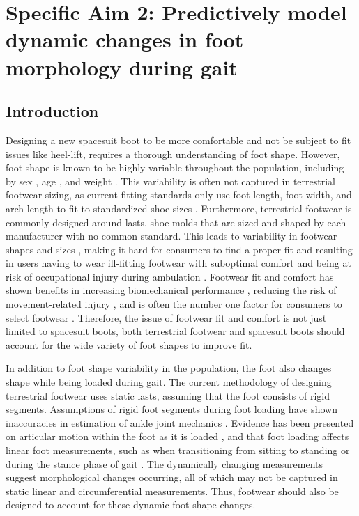 \documentclass[defaultstyle,11pt]{thesis}
\begin{document}
\hypertarget{sec:SA2}{%
\chapter{Specific Aim 2: Predictively model dynamic changes in foot morphology during gait}\label{sec:SA2}}

\hypertarget{introduction-1}{%
\section{Introduction}\label{introduction-1}}

Designing a new spacesuit boot to be more comfortable and not be subject to fit issues like heel-lift, requires a thorough understanding of foot shape.
However, foot shape is known to be highly variable throughout the population, including by sex \citep{Wunderlich2001, Krauss2008, Krauss2010}, age \citep{Tomassoni2014}, and weight \citep{Price2016}.
This variability is often not captured in terrestrial footwear sizing, as current fitting standards only use foot length, foot width, and arch length to fit to standardized shoe sizes \citep{ASTM2017}.
Furthermore, terrestrial footwear is commonly designed around lasts, shoe molds that are sized and shaped by each manufacturer with no common standard.
This leads to variability in footwear shapes and sizes \citep{Jurca2013, Wannop2019}, making it hard for consumers to find a proper fit and resulting in users having to wear ill-fitting footwear with suboptimal comfort and being at risk of occupational injury during ambulation \citep{Dobson2018b}.
Footwear fit and comfort has shown benefits in increasing biomechanical performance \citep{Pryhoda2021}, reducing the risk of movement-related injury \citep{Mundermann2001a}, and is often the number one factor for consumers to select footwear \citep{Martinez-Martinez2017}.
Therefore, the issue of footwear fit and comfort is not just limited to spacesuit boots, both terrestrial footwear and spacesuit boots should account for the wide variety of foot shapes to improve fit.

In addition to foot shape variability in the population, the foot also changes shape while being loaded during gait.
The current methodology of designing terrestrial footwear uses static lasts, assuming that the foot consists of rigid segments.
Assumptions of rigid foot segments during foot loading have shown inaccuracies in estimation of ankle joint mechanics \citep{Zelik2018, Kessler2020}.
Evidence has been presented on articular motion within the foot as it is loaded \citep{Lundgren2008, Wolf2008}, and that foot loading affects linear foot measurements, such as when transitioning from sitting to standing \citep{Xiong2009, Oladipo2008} or during the stance phase of gait \citep{Kouchi2009, Barisch-Fritz2014, Grau2018}.
The dynamically changing measurements suggest morphological changes occurring, all of which may not be captured in static linear and circumferential measurements.
Thus, footwear should also be designed to account for these dynamic foot shape changes.
\end{document}
